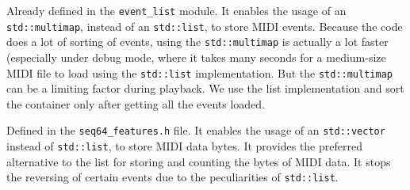         Already defined in the \texttt{event\_list} module.
        It enables the usage of an
        \texttt{std::multimap}, instead of an \texttt{std::list},
        to store MIDI events.  Because
        the code does a lot of sorting of events, using the
        \texttt{std::multimap} is actually a lot faster (especially under debug
        mode, where it takes
        many seconds for a medium-size MIDI file to load using the
        \texttt{std::list} implementation.
        But the \texttt{std::multimap} can be a limiting factor during playback.
        We use the list implementation and sort the container only after
        getting all the events loaded.

        Defined in the \texttt{seq64\_features.h} file.
        It enables the usage of an
        \texttt{std::vector} instead of \texttt{std::list},
        to store MIDI data bytes.
        It provides the preferred alternative to the list for storing and
        counting the bytes of MIDI data.  It stops the reversing of
        certain events due to the peculiarities of \texttt{std::list}.
%
%
%
%
%
